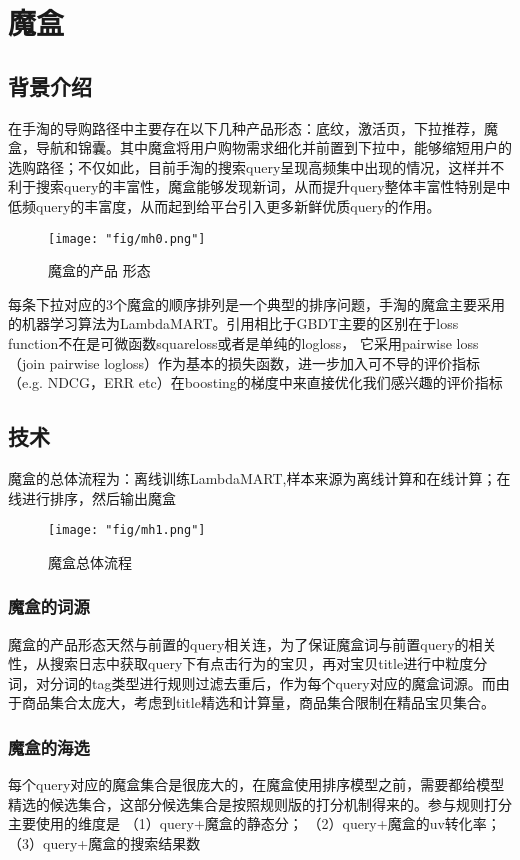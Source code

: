 \section{魔盒}
\subsection{背景介绍}
在手淘的导购路径中主要存在以下几种产品形态：底纹，激活页，下拉推荐，魔盒，导航和锦囊。其中魔盒将用户购物需求细化并前置到下拉中，能够缩短用户的选购路径；不仅如此，目前手淘的搜索query呈现高频集中出现的情况，这样并不利于搜索query的丰富性，魔盒能够发现新词，从而提升query整体丰富性特别是中低频query的丰富度，从而起到给平台引入更多新鲜优质query的作用。
\begin{figure}[!h]
	\centering
	\texttt{[image: "fig/mh0.png"]}
	\caption{魔盒的产品 形态}
	\label{fig:mh0}
\end{figure}
每条下拉对应的3个魔盒的顺序排列是一个典型的排序问题，手淘的魔盒主要采用的机器学习算法为LambdaMART。引用相比于GBDT主要的区别在于loss function不在是可微函数squareloss或者是单纯的logloss， 它采用pairwise loss （join pairwise logloss）作为基本的损失函数，进一步加入可不导的评价指标（e.g. NDCG，ERR etc）在boosting的梯度中来直接优化我们感兴趣的评价指标

\subsection{技术}
魔盒的总体流程为：离线训练LambdaMART,样本来源为离线计算和在线计算；在线进行排序，然后输出魔盒
\begin{figure}[!h]
	\centering
	\texttt{[image: "fig/mh1.png"]}
	\caption{魔盒总体流程}
	\label{fig:mh1}
\end{figure}

\subsubsection{魔盒的词源}
魔盒的产品形态天然与前置的query相关连，为了保证魔盒词与前置query的相关性，从搜索日志中获取query下有点击行为的宝贝，再对宝贝title进行中粒度分词，对分词的tag类型进行规则过滤去重后，作为每个query对应的魔盒词源。而由于商品集合太庞大，考虑到title精选和计算量，商品集合限制在精品宝贝集合。
\subsubsection{魔盒的海选}
每个query对应的魔盒集合是很庞大的，在魔盒使用排序模型之前，需要都给模型精选的候选集合，这部分候选集合是按照规则版的打分机制得来的。参与规则打分主要使用的维度是 （1）query+魔盒的静态分； （2）query+魔盒的uv转化率； （3）query+魔盒的搜索结果数
